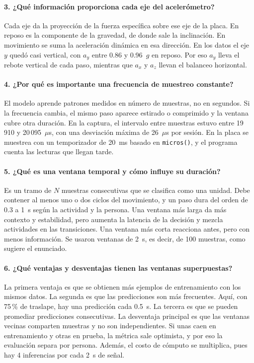 \documentclass[11pt,a4paper]{article}
\begin{document}
\paragraph{3. ¿Qué información proporciona cada eje del acelerómetro?}
Cada eje da la proyección de la fuerza específica sobre ese eje de la placa. En reposo es la componente de la gravedad, de donde sale la inclinación. En movimiento se suma la aceleración dinámica en esa dirección. En los datos el eje $y$ quedó casi vertical, con $a_y$ entre 0.86 y 0.96~$g$ en reposo. Por eso $a_y$ lleva el rebote vertical de cada paso, mientras que $a_x$ y $a_z$ llevan el balanceo horizontal.

\paragraph{4. ¿Por qué es importante una frecuencia de muestreo constante?}
El modelo aprende patrones medidos en número de muestras, no en segundos. Si la frecuencia cambia, el mismo paso aparece estirado o comprimido y la ventana cubre otra duración. En la captura, el intervalo entre muestras estuvo entre 19\,910 y 20\,095~$\mu$s, con una desviación máxima de 26~$\mu$s por sesión. En la placa se muestrea con un temporizador de 20~ms basado en \texttt{micros()}, y el programa cuenta las lecturas que llegan tarde.

\paragraph{5. ¿Qué es una ventana temporal y cómo influye su duración?}
Es un tramo de $N$ muestras consecutivas que se clasifica como una unidad. Debe contener al menos uno o dos ciclos del movimiento, y un paso dura del orden de 0.3 a 1~s según la actividad y la persona. Una ventana más larga da más contexto y estabilidad, pero aumenta la latencia de la decisión y mezcla actividades en las transiciones. Una ventana más corta reacciona antes, pero con menos información. Se usaron ventanas de 2~s, es decir, de 100 muestras, como sugiere el enunciado.

\paragraph{6. ¿Qué ventajas y desventajas tienen las ventanas superpuestas?}
La primera ventaja es que se obtienen más ejemplos de entrenamiento con los mismos datos. La segunda es que las predicciones son más frecuentes. Aquí, con 75\,\% de traslape, hay una predicción cada 0.5~s. La tercera es que se pueden promediar predicciones consecutivas. La desventaja principal es que las ventanas vecinas comparten muestras y no son independientes. Si unas caen en entrenamiento y otras en prueba, la métrica sale optimista, y por eso la evaluación separa por persona. Además, el costo de cómputo se multiplica, pues hay 4 inferencias por cada 2~s de señal.
\end{document}
